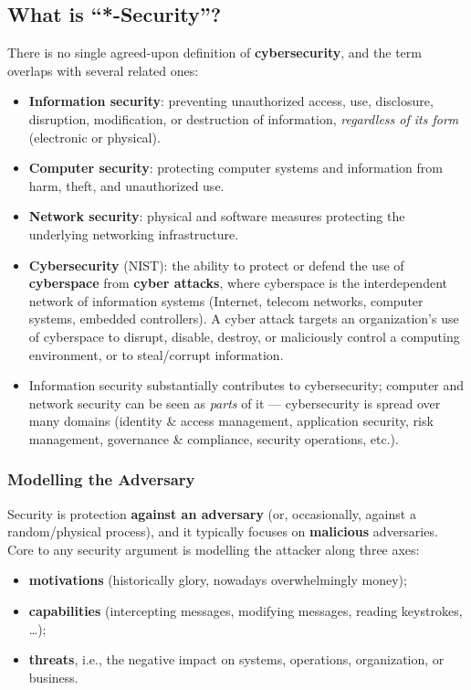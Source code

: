 \documentclass[12pt, a4paper]{article}
\begin{document}
\subsection{What is ``*-Security''?}

There is no single agreed-upon definition of \textbf{cybersecurity}, and the term overlaps with several related ones:
\begin{itemize}
    \item \textbf{Information security}: preventing unauthorized access, use, disclosure, disruption, modification, or destruction of information, \emph{regardless of its form} (electronic or physical).
    \item \textbf{Computer security}: protecting computer systems and information from harm, theft, and unauthorized use.
    \item \textbf{Network security}: physical and software measures protecting the underlying networking infrastructure.
    \item \textbf{Cybersecurity} (NIST): the ability to protect or defend the use of \textbf{cyberspace} from \textbf{cyber attacks}, where cyberspace is the interdependent network of information systems (Internet, telecom networks, computer systems, embedded controllers). A cyber attack targets an organization's use of cyberspace to disrupt, disable, destroy, or maliciously control a computing environment, or to steal/corrupt information.
\end{itemize}

\begin{itemize}
    \item Information security substantially contributes to cybersecurity; computer and network security can be seen as \emph{parts} of it — cybersecurity is spread over many domains (identity \& access management, application security, risk management, governance \& compliance, security operations, etc.).
\end{itemize}

\subsubsection{Modelling the Adversary}
Security is protection \textbf{against an adversary} (or, occasionally, against a random/physical process), and it typically focuses on \textbf{malicious} adversaries. Core to any security argument is modelling the attacker along three axes:
\begin{itemize}
    \item \textbf{motivations} (historically glory, nowadays overwhelmingly money);
    \item \textbf{capabilities} (intercepting messages, modifying messages, reading keystrokes, \dots);
    \item \textbf{threats}, i.e., the negative impact on systems, operations, organization, or business.
\end{itemize}
\end{document}
